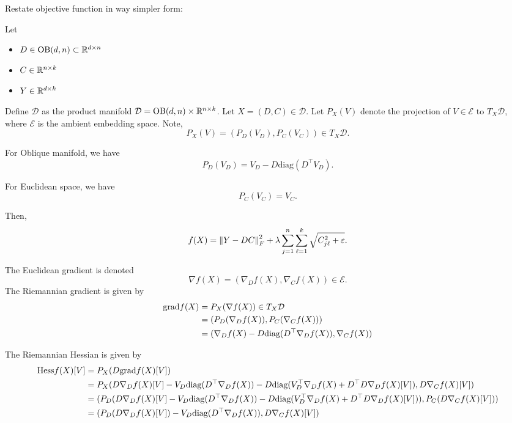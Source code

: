\documentclass[letterpaper, 10 pt, conference, onecolumn]{ieeeconf}
\theoremstyle{definition}
\theoremstyle{plain}
\begin{document}
Restate objective function in way simpler form:

Let 
\begin{itemize}
    \item $D\in\text{OB}(d,n)\subset\mathbb{R}^{d\times n}$
    \item $C\in\mathbb{R}^{n\times k}$
    \item $Y\in\mathbb{R}^{d\times k}$
\end{itemize}

Define $\mathcal{D}$ as the product manifold $\mathcal{D} = \text{OB}(d,n) \times \mathbb{R}^{n\times k}$.
Let $X=(D,C) \in \mathcal{D}$.
Let $P_X(V)$ denote the projection of $V\in\mathcal{E}$ to $T_X\mathcal{D}$, where $\mathcal{E}$ is the ambient embedding space.
Note,
\begin{equation}
    P_X(V) = (P_D(V_D), P_C(V_C)) \in T_X\mathcal{D}.
\end{equation}

For Oblique manifold, we have
\begin{equation}
    P_D(V_D) = V_D - D \text{diag}(D^\top V_D).
\end{equation}

For Euclidean space, we have
\begin{equation}
    P_C(V_C) = V_C.
\end{equation}

Then,
\begin{equation}
    f(X) = \left\lVert Y-DC \right\rVert_F^2 + \lambda \sum_{j=1}^n\sum_{\ell=1}^k \sqrt{C_{j\ell}^2+\varepsilon}.
\end{equation}

The Euclidean gradient is denoted 
\begin{equation}
    \nabla f (X) = (\nabla_D f(X), \nabla_C f(X)) \in \mathcal{E}.
\end{equation}
The Riemannian gradient is given by
\begin{align}
    \text{grad} f(X) 
    &= P_X(\nabla f(X)) \in T_X\mathcal{D}
    \\
    &= (P_D(\nabla_D f(X)), P_C(\nabla_C f(X)))
    \\
    &= (\nabla_D f(X) - D \text{diag}(D^\top \nabla_D f(X)), \nabla_C f(X))
\end{align} 

The Riemannian Hessian is given by
\begin{align}
    \text{Hess} f(X)[V] 
    &= P_X(D \text{grad} f(X) [V])
    \\
    &= P_X(D\nabla_D f(X)[V] - V_D\text{diag}(D^\top \nabla_D f(X)) - D\text{diag}(V_D^\top\nabla_D f(X) + D^\top D\nabla_Df(X)[V]), D\nabla_Cf(X)[V])
    \\
    &= (P_D(D\nabla_D f(X)[V] - V_D\text{diag}(D^\top \nabla_D f(X)) - D\text{diag}(V_D^\top\nabla_D f(X) + D^\top D\nabla_Df(X)[V])),
    P_C(D\nabla_Cf(X)[V]))
    \\
    &= (P_D(D\nabla_D f(X)[V]) - V_D\text{diag}(D^\top \nabla_D f(X)),
    D\nabla_Cf(X)[V])
\end{align}
\end{document}
